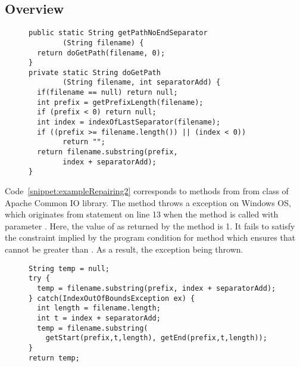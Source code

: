 \subsection{Overview}
\label{subsec:overview}

\begin{figure}[t]
\centering
\begin{lstlisting}
public static String getPathNoEndSeparator
        (String filename) {
  return doGetPath(filename, 0);
}
private static String doGetPath
        (String filename, int separatorAdd) {
  if(filename == null) return null;
  int prefix = getPrefixLength(filename);
  if (prefix < 0) return null;
  int index = indexOfLastSeparator(filename);
  if ((prefix >= filename.length()) || (index < 0))
        return "";
  return filename.substring(prefix,
        index + separatorAdd);
}
\end{lstlisting}
\end{figure}

Code~\ref{snippet:exampleRepairing2} corresponds to methods from from
 class of Apache Common IO library. The method
 throws a  exception
on Windows OS, which originates from statement  on line 13 when the method is
called with parameter .  Here, the value of  as
returned by the method  is 1. It fails to satisfy the
constraint implied by the program condition  for  method which  ensures that 
cannot be greater than . As a result, the exception being thrown.


\begin{figure}[t]
\centering
\begin{lstlisting}
String temp = null;
try {
  temp = filename.substring(prefix, index + separatorAdd);
} catch(IndexOutOfBoundsException ex) {
  int length = filename.length;
  int t = index + separatorAdd;
  temp = filename.substring(
    getStart(prefix,t,length), getEnd(prefix,t,length));
}
return temp;
\end{lstlisting}
\end{figure}

